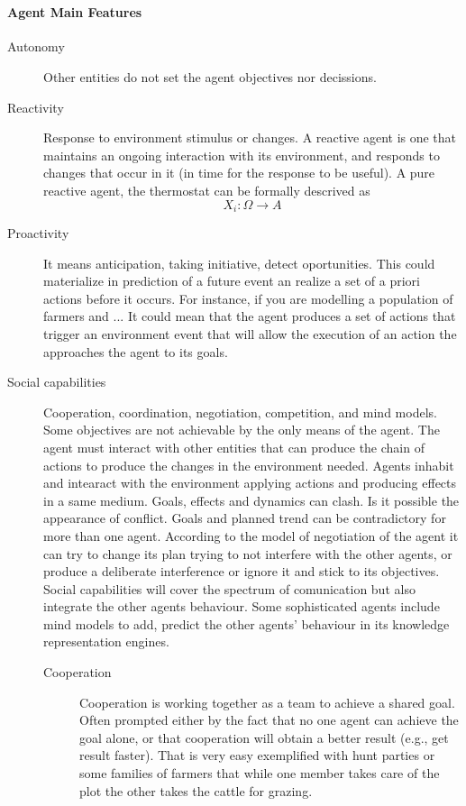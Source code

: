 \documentclass{report}
\begin{document}
\\
\paragraph{Agent Main Features}
\begin{description}
	\item [Autonomy] Other entities do not set the agent objectives nor decissions.
	\item [Reactivity] Response to environment stimulus or changes. A reactive agent is 
	one that maintains an ongoing interaction with its environment, and responds to changes 
	that occur in it (in time for the response to be useful). A pure reactive agent, the 
	thermostat can be formally descrived as
	\begin{equation}
		X_i : \Omega \longrightarrow A 
	\end{equation}
	\item [Proactivity] It means anticipation, taking initiative, detect oportunities. This
	could materialize in prediction of a future event an realize a set of a priori actions 
	before it occurs. For instance, if you are modelling a population of farmers and ... 
	It could mean that the agent produces a set of actions that trigger an environment event
	that will allow the execution of an action the approaches the agent to its goals.
	\item [Social capabilities] Cooperation, coordination, negotiation, competition, and mind models.
	Some objectives are not achievable by the only means of the agent. The agent must interact
	with other entities that can produce the chain of actions to produce the changes in the
	environment needed.
	Agents inhabit and intearact with the environment applying actions and producing effects
	in a same medium. Goals, effects and dynamics can clash. Is it possible the appearance of
	conflict. Goals and planned trend can be contradictory for more than one agent. According
	to the model of negotiation of the agent it can try to change its plan trying to not interfere
	with the other agents, or produce a deliberate interference or ignore it and stick to its
	objectives.
	Social capabilities will cover the spectrum of comunication but also integrate the other agents
	behaviour. Some sophisticated agents include mind models to add, predict the other agents' 
	behaviour in its knowledge representation engines.
	\begin{description}
		\item [Cooperation] Cooperation is working together as a team to achieve a shared goal.
		Often prompted either by the fact that no one agent can achieve the goal alone, or that 
		cooperation will obtain a better result (e.g., get result faster). That is very easy
		exemplified with hunt parties or some families of farmers that while one member takes care
		of the plot the other takes the cattle for grazing.


\end{description}
\end{description}
\end{document}
